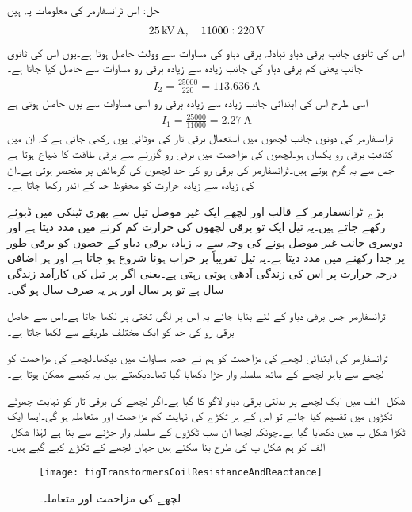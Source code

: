 حل:	اس ٹرانسفارمر کی معلومات یہ ہیں
\begin{align*}
\SI{25}{\kilo \volt \ampere}, \quad 11000:220\,\textup{V}
\end{align*}
اس کی ثانوی جانب برقی دباو تبادلہ برقی دباو کی مساوات سے   وولٹ حاصل ہوتا ہے۔یوں اس کی ثانوی جانب یعنی کم برقی دباو کی جانب زیادہ سے زیادہ برقی رو مساوات   سے حاصل کیا جاتا ہے۔
\begin{align*}
I_2=\frac{25000}{220}=\SI{113.636}{\ampere}
\end{align*}
اسی طرح اس کی ابتدائی جانب زیادہ سے زیادہ برقی رو اسی مساوات سے یوں حاصل ہوتی ہے
\begin{align*}
I_1=\frac{25000}{11000}=\SI{2.27}{\ampere}
\end{align*}
%
ٹرانسفارمر کی دونوں جانب لچھوں میں استعمال برقی تار کی موٹائی یوں رکھی جاتی ہے کہ ان میں کثافتِ برقی رو  یکساں ہو۔لچھوں کی مزاحمت میں برقی رو گزرنے سے برقی طاقت کا ضیاع ہوتا ہے جس سے یہ گرم ہوتے ہیں۔ٹرانسفارمر کی برقی رو کی حد لچھوں کی گرمائش پر منحصر ہوتی ہے۔ان کی زیادہ سے زیادہ حرارت کو محفوظ حد کے اندر رکھا جاتا ہے۔

بڑے ٹرانسفارمر کے قالب اور لچھے ایک غیر موصل تیل سے بھری ٹینکی میں ڈبوئے رکھے جاتے ہیں۔یہ تیل ایک تو برقی لچھوں کی حرارت کم کرنے میں مدد دیتا ہے اور دوسری جانب غیر موصل ہونے کی وجہ سے یہ زیادہ برقی دباو کے حصوں کو برقی طور پر جدا رکھنے میں مدد دیتا ہے۔یہ تیل تقریباً   پر خراب ہونا شروع ہو جاتا ہے اور ہر  اضافی درجہ حرارت پر اس کی زندگی آدھی ہوتی رہتی ہے۔یعنی اگر  پر تیل کی کارآمد زندگی  سال ہے تو  پر  سال اور   پر یہ صرف   سال ہو گی۔

	ٹرانسفارمر جس برقی دباو کے لئے بنایا جائے  یہ اس پر لگی تختی پر لکھا جاتا ہے۔اس سے حاصل برقی رو کی حد کو ایک مختلف طریقے سے لکھا جاتا ہے۔

ٹرانسفارمر کی ابتدائی لچھے کی مزاحمت  کو ہم نے حصہ  مساوات  میں دیکھا۔لچھے کی مزاحمت کو لچھے سے باہر لچھے کے ساتھ سلسلہ وار جڑا دکھایا گیا تھا۔دیکھتے ہیں یہ کیسے ممکن ہوتا ہے۔

شکل -الف میں ایک لچھے پر بدلتی برقی دباو لاگو کا گیا ہے۔اگر لچھے کی برقی تار کو نہایت چھوٹے ٹکڑوں میں تقسیم کیا جائے تو اس کے ہر ٹکڑے کی نہایت کم مزاحمت  اور متعاملہ ہو گی۔ایسا ایک ٹکڑا شکل-ب میں دکھایا گیا ہے۔چونکہ لچھا ان سب ٹکڑوں کے سلسلہ وار جڑنے سے بنا ہے  لہٰذا شکل-الف کو ہم شکل-پ کی طرح بنا سکتے ہیں جہاں لچھے کے  ٹکڑے  کیے گیے ہیں۔
\begin{figure}
\centering
\texttt{[image: figTransformersCoilResistanceAndReactance]}
\caption{لچھے کی مزاحمت اور متعاملہ۔}
\label{شکل_ٹرانسفارمر_لچھے_کی_مزاحمت_اور_متعاملہ}
\end{figure}

